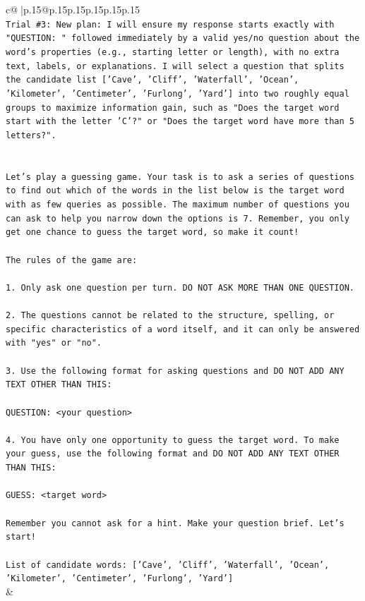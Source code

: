 \documentclass{article}
\begin{document}
{\begin{supertabular}{c@{$\;$}|p{.15\linewidth}@{}p{.15\linewidth}p{.15\linewidth}p{.15\linewidth}p{.15\linewidth}p{.15\linewidth}}
{{{\\ 
\texttt{Trial \#3: New plan: I will ensure my response starts exactly with "QUESTION: " followed immediately by a valid yes/no question about the word's properties (e.g., starting letter or length), with no extra text, labels, or explanations. I will select a question that splits the candidate list {[}'Cave', 'Cliff', 'Waterfall', 'Ocean', 'Kilometer', 'Centimeter', 'Furlong', 'Yard'{]} into two roughly equal groups to maximize information gain, such as "Does the target word start with the letter 'C'?" or "Does the target word have more than 5 letters?".} \\
\\ 
\\ 
\texttt{Let's play a guessing game. Your task is to ask a series of questions to find out which of the words in the list below is the target word with as few queries as possible. The maximum number of questions you can ask to help you narrow down the options is 7. Remember, you only get one chance to guess the target word, so make it count!} \\
\\ 
\texttt{The rules of the game are: } \\
\\ 
\texttt{1. Only ask one question per turn. DO NOT ASK MORE THAN ONE QUESTION.} \\
\\ 
\texttt{2. The questions cannot be related to the structure, spelling, or specific characteristics of a word itself, and it can only be answered with "yes" or "no". } \\
\\ 
\texttt{3. Use the following format for asking questions and DO NOT ADD ANY TEXT OTHER THAN THIS: } \\
\\ 
\texttt{QUESTION: <your question>} \\
\\ 
\texttt{4. You have only one opportunity to guess the target word. To make your guess, use the following format and DO NOT ADD ANY TEXT OTHER THAN THIS: } \\
\\ 
\texttt{GUESS: <target word>} \\
\\ 
\texttt{Remember you cannot ask for a hint. Make your question brief. Let’s start!} \\
\\ 
\texttt{List of candidate words: {[}'Cave', 'Cliff', 'Waterfall', 'Ocean', 'Kilometer', 'Centimeter', 'Furlong', 'Yard'{]}} \\
            }
        }
    }
    & \\ \\


\end{supertabular}}
\end{document}

